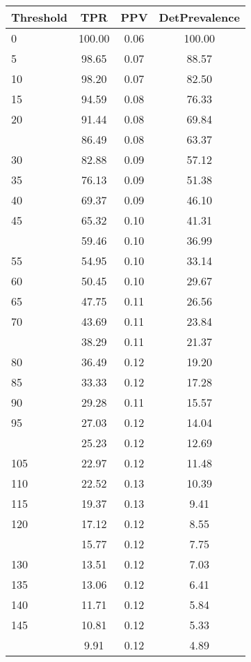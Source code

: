 \begin{table}[ht]
\centering
\begin{tabular}{lccc}
  \toprule
Threshold & TPR & PPV & DetPrevalence \\ 
  \midrule
0 & 100.00 & 0.06 & 100.00 \\ 
  5 & 98.65 & 0.07 & 88.57 \\ 
  10 & 98.20 & 0.07 & 82.50 \\ 
  15 & 94.59 & 0.08 & 76.33 \\ 
  20 & 91.44 & 0.08 & 69.84 \\ 
   \addlinespace
25 & 86.49 & 0.08 & 63.37 \\ 
  30 & 82.88 & 0.09 & 57.12 \\ 
  35 & 76.13 & 0.09 & 51.38 \\ 
  40 & 69.37 & 0.09 & 46.10 \\ 
  45 & 65.32 & 0.10 & 41.31 \\ 
   \addlinespace
50 & 59.46 & 0.10 & 36.99 \\ 
  55 & 54.95 & 0.10 & 33.14 \\ 
  60 & 50.45 & 0.10 & 29.67 \\ 
  65 & 47.75 & 0.11 & 26.56 \\ 
  70 & 43.69 & 0.11 & 23.84 \\ 
   \addlinespace
75 & 38.29 & 0.11 & 21.37 \\ 
  80 & 36.49 & 0.12 & 19.20 \\ 
  85 & 33.33 & 0.12 & 17.28 \\ 
  90 & 29.28 & 0.11 & 15.57 \\ 
  95 & 27.03 & 0.12 & 14.04 \\ 
   \addlinespace
100 & 25.23 & 0.12 & 12.69 \\ 
  105 & 22.97 & 0.12 & 11.48 \\ 
  110 & 22.52 & 0.13 & 10.39 \\ 
  115 & 19.37 & 0.13 & 9.41 \\ 
  120 & 17.12 & 0.12 & 8.55 \\ 
   \addlinespace
125 & 15.77 & 0.12 & 7.75 \\ 
  130 & 13.51 & 0.12 & 7.03 \\ 
  135 & 13.06 & 0.12 & 6.41 \\ 
  140 & 11.71 & 0.12 & 5.84 \\ 
  145 & 10.81 & 0.12 & 5.33 \\ 
   \addlinespace
150 & 9.91 & 0.12 & 4.89 \\ 

\end{tabular}
\end{table}
